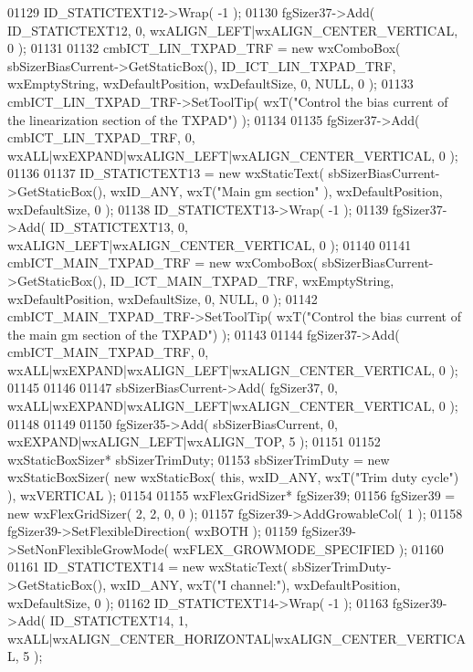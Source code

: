 \begin{DoxyCode}
01129     ID_STATICTEXT12->Wrap( -1 );
01130     fgSizer37->Add( ID_STATICTEXT12, 0, wxALIGN\_LEFT|wxALIGN\_CENTER\_VERTICAL, 0 );
01131     
01132     cmbICT_LIN_TXPAD_TRF = \textcolor{keyword}{new} wxComboBox( sbSizerBiasCurrent->GetStaticBox(), 
      ID_ICT_LIN_TXPAD_TRF, wxEmptyString, wxDefaultPosition, wxDefaultSize, 0, NULL, 0 ); 
01133     cmbICT_LIN_TXPAD_TRF->SetToolTip( wxT(\textcolor{stringliteral}{"Control the bias current of the linearization section of the
       TXPAD"}) );
01134     
01135     fgSizer37->Add( cmbICT_LIN_TXPAD_TRF, 0, wxALL|wxEXPAND|wxALIGN\_LEFT|wxALIGN\_CENTER\_VERTICAL, 0 );
01136     
01137     ID_STATICTEXT13 = \textcolor{keyword}{new} wxStaticText( sbSizerBiasCurrent->GetStaticBox(), wxID\_ANY, wxT(\textcolor{stringliteral}{"Main gm section"}
      ), wxDefaultPosition, wxDefaultSize, 0 );
01138     ID_STATICTEXT13->Wrap( -1 );
01139     fgSizer37->Add( ID_STATICTEXT13, 0, wxALIGN\_LEFT|wxALIGN\_CENTER\_VERTICAL, 0 );
01140     
01141     cmbICT_MAIN_TXPAD_TRF = \textcolor{keyword}{new} wxComboBox( sbSizerBiasCurrent->GetStaticBox(), 
      ID_ICT_MAIN_TXPAD_TRF, wxEmptyString, wxDefaultPosition, wxDefaultSize, 0, NULL, 0 ); 
01142     cmbICT_MAIN_TXPAD_TRF->SetToolTip( wxT(\textcolor{stringliteral}{"Control the bias current of the main gm section of the TXPAD"}) 
      );
01143     
01144     fgSizer37->Add( cmbICT_MAIN_TXPAD_TRF, 0, wxALL|wxEXPAND|wxALIGN\_LEFT|wxALIGN\_CENTER\_VERTICAL, 0 );
01145     
01146     
01147     sbSizerBiasCurrent->Add( fgSizer37, 0, wxALL|wxEXPAND|wxALIGN\_LEFT|wxALIGN\_CENTER\_VERTICAL, 0 );
01148     
01149     
01150     fgSizer35->Add( sbSizerBiasCurrent, 0, wxEXPAND|wxALIGN\_LEFT|wxALIGN\_TOP, 5 );
01151     
01152     wxStaticBoxSizer* sbSizerTrimDuty;
01153     sbSizerTrimDuty = \textcolor{keyword}{new} wxStaticBoxSizer( \textcolor{keyword}{new} wxStaticBox( \textcolor{keyword}{this}, wxID\_ANY, wxT(\textcolor{stringliteral}{"Trim duty cycle"}) ), 
      wxVERTICAL );
01154     
01155     wxFlexGridSizer* fgSizer39;
01156     fgSizer39 = \textcolor{keyword}{new} wxFlexGridSizer( 2, 2, 0, 0 );
01157     fgSizer39->AddGrowableCol( 1 );
01158     fgSizer39->SetFlexibleDirection( wxBOTH );
01159     fgSizer39->SetNonFlexibleGrowMode( wxFLEX\_GROWMODE\_SPECIFIED );
01160     
01161     ID_STATICTEXT14 = \textcolor{keyword}{new} wxStaticText( sbSizerTrimDuty->GetStaticBox(), wxID\_ANY, wxT(\textcolor{stringliteral}{"I channel:"}), 
      wxDefaultPosition, wxDefaultSize, 0 );
01162     ID_STATICTEXT14->Wrap( -1 );
01163     fgSizer39->Add( ID_STATICTEXT14, 1, wxALL|wxALIGN\_CENTER\_HORIZONTAL|wxALIGN\_CENTER\_VERTICAL, 5 );

\end{DoxyCode}

